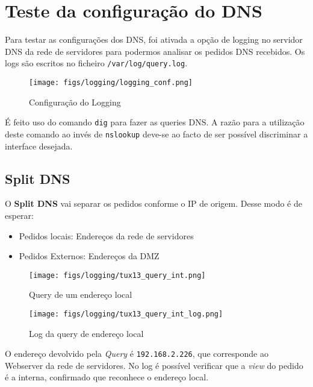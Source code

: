 \chapter{Teste da configuração do DNS} \label{Testing}

Para testar as configurações dos DNS, foi ativada a opção de logging no servidor DNS da rede de servidores para podermos analisar os pedidos DNS recebidos.
Os logs são escritos no ficheiro \verb|/var/log/query.log|.

\begin{figure}[H]
    \centering
    \texttt{[image: figs/logging/logging\_conf.png]}
    \caption{Configuração do Logging}
    \label{fig:logging_conf}
\end{figure}

É feito uso do comando \verb|dig| para fazer as queries DNS.
A razão para a utilização deste comando ao invés de \verb|nslookup| deve-se ao facto de ser possível discriminar a interface desejada.

\section{Split DNS} \label{split_dns}

O \textbf{Split DNS} vai separar os pedidos conforme o IP de origem.
Desse modo é de esperar:
\begin{itemize}
    \item Pedidos locais: Endereços da rede de servidores
    \item Pedidos Externos: Endereços da DMZ
\end{itemize}

\begin{figure}[H]
    \centering
    \texttt{[image: figs/logging/tux13\_query\_int.png]}
    \caption{Query de um endereço local}
    \label{fig:tux13_query_int}
\end{figure}

\begin{figure}[H]
    \centering
    \texttt{[image: figs/logging/tux13\_query\_int\_log.png]}
    \caption{Log da query de endereço local}
    \label{fig:tux13_query_int_log}
\end{figure}

O endereço devolvido pela \textit{Query} é \verb|192.168.2.226|, que corresponde ao Webserver da rede de servidores.
No log é possível verificar que a \textit{view} do pedido é a interna, confirmado que reconhece o endereço local.



